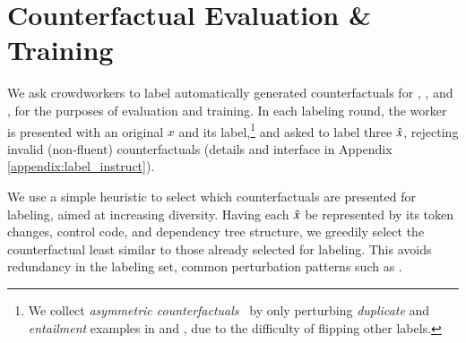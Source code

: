 \section{Counterfactual Evaluation \& Training}
\label{sec:app_label}

We ask crowdworkers to label automatically generated counterfactuals for \sst, \nli, and \qqp, for the purposes of evaluation and training. In each labeling round, the worker is presented with an original $x$ and its label,\footnote{We collect \emph{asymmetric counterfactuals}~\cite{garg2019counterfactual} by only perturbing \emph{duplicate} and \emph{entailment} examples in \qqp and \nli, due to the difficulty of flipping other labels.} and asked to label three $\hat{x}$, rejecting invalid (non-fluent) counterfactuals (details and interface in Appendix \ref{appendix:label_instruct}).

We use a simple heuristic to select which counterfactuals are presented for labeling, aimed at increasing diversity. Having each $\hat{x}$ be represented by its token changes, control code, and dependency tree structure, we greedily select the counterfactual least similar to those already selected for labeling. This avoids redundancy in the labeling set, \eg common perturbation patterns such as .


